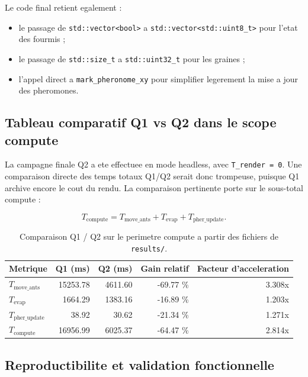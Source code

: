\documentclass[11pt,a4paper]{article}
\begin{document}
Le code final retient egalement :

\begin{itemize}[leftmargin=1.2em]
  \item le passage de \texttt{std::vector<bool>} a \texttt{std::vector<std::uint8\_t>} pour l'etat des fourmis ;
  \item le passage de \texttt{std::size\_t} a \texttt{std::uint32\_t} pour les graines ;
  \item l'appel direct a \texttt{mark\_pheronome\_xy} pour simplifier legerement la mise a jour des pheromones.
\end{itemize}

\subsection{Tableau comparatif Q1 vs Q2 dans le scope compute}

La campagne finale Q2 a ete effectuee en mode headless, avec \texttt{T\_render = 0}. Une comparaison directe des temps totaux Q1/Q2 serait donc trompeuse, puisque Q1 archive encore le cout du rendu. La comparaison pertinente porte sur le sous-total compute :

\[
T_{\text{compute}} = T_{\text{move\_ants}} + T_{\text{evap}} + T_{\text{pher\_update}}.
\]

\begin{table}[H]
  \centering
  \small
  \caption{Comparaison Q1 / Q2 sur le perimetre compute a partir des fichiers de \texttt{results/}.}
  \label{tab:q1-q2-compare}
  \begin{tabular}{@{}lrrrr@{}}
    \toprule
    Metrique & Q1 (ms) & Q2 (ms) & Gain relatif & Facteur d'acceleration \\
    \midrule
    \(T_{\text{move\_ants}}\) & 15253.78 & 4611.60 & -69.77 \% & 3.308x \\
    \(T_{\text{evap}}\) & 1664.29 & 1383.16 & -16.89 \% & 1.203x \\
    \(T_{\text{pher\_update}}\) & 38.92 & 30.62 & -21.34 \% & 1.271x \\
    \(T_{\text{compute}}\) & 16956.99 & 6025.37 & -64.47 \% & 2.814x \\
    \bottomrule
  \end{tabular}
\end{table}

\subsection{Reproductibilite et validation fonctionnelle}
\end{document}
